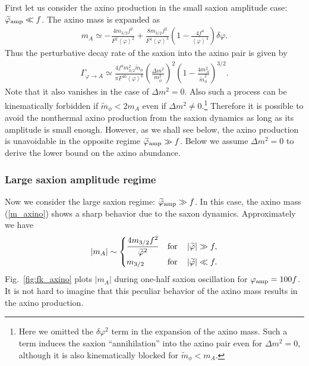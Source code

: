 \documentclass[12pt, a4paper]{article}
\begin{document}
First let us consider the axino production in the small saxion amplitude case: $\widetilde\varphi_{\rm amp} \ll f$.
The axino mass is expanded as
\begin{align}
	m_A \simeq - \frac{4 m_{3/2} f^2}{F^2 \left<\varphi\right>^2}
	+\frac{8 m_{3/2} f^2}{F^4 \left<\varphi\right>^3} \left(1 - \frac{4f^4}{\left<\varphi\right>^4} \right)\delta\varphi.
\end{align}
Thus the perturbative decay rate of the saxion into the axino pair is given by
\begin{align}
	\Gamma_{\varphi \to A} \simeq \frac{4 f^4 m_{3/2}^2 \widetilde m_{\phi}}{\pi F^{10} \left<\varphi\right>^6 }
	\left( \frac{\Delta m^2}{m_{\bar\phi}^2} \right)^2
	\left(1- \frac{4m_A^2}{\widetilde m_\phi^2} \right)^{3/2}.
\end{align}
Note that it also vanishes in the case of $\Delta m^2=0$.
Also such a process can be kinematically forbidden if $\widetilde m_\phi < 2 m_A$ even if $\Delta m^2\neq 0$.\footnote{
	Here we omitted the $\delta\varphi^2$ term in the expansion of the axino mass.
	Such a term induces the saxion ``annihilation'' into the axino pair even for $\Delta m^2=0$, although
	it is also kinematically blocked for $\widetilde m_\phi < m_A$.
}
Therefore it is possible to avoid the nonthermal axino production from the saxion dynamics as long as its amplitude is small enough.
However, as we shall see below, the axino production is unavoidable in the opposite regime $\widetilde\varphi_{\rm amp} \gg f$.
Below we assume $\Delta m^2=0$ to derive the lower bound on the axino abundance.



\subsubsection{Large saxion amplitude regime}

Now we consider the large saxion regime: $\widetilde\varphi_{\rm amp} \gg f$.
In this case, the axino mass (\ref{m_axino}) shows a sharp behavior due to the saxon dynamics. 
Approximately we have
\begin{align}
	|m_A| \sim \begin{cases}
	\displaystyle \frac{4m_{3/2}f^2}{\widetilde\varphi^2} & {\rm for}~~~\left\lvert \widetilde\varphi \right\rvert \gg f,\\
	\displaystyle m_{3/2} & {\rm for}~~~\left\lvert \widetilde \varphi \right\rvert \ll f.
	\end{cases}
\end{align}
Fig.~\ref{fig:fk_axino} plots $|m_A|$ during one-half saxion oscillation for $\varphi_{\rm amp} = 100f$.
It is not hard to imagine that this peculiar behavior of the axino mass results in the axino production.
\end{document}
